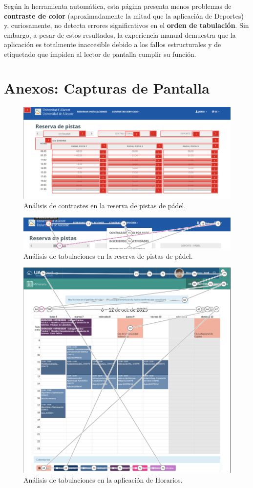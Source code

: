 \documentclass{article}
\begin{document}
	Según la herramienta automática, esta página presenta menos problemas de \textbf{contraste de color} (aproximadamente la mitad que la aplicación de Deportes) y, curiosamente, no detecta errores significativos en el \textbf{orden de tabulación}. Sin embargo, a pesar de estos resultados, la experiencia manual demuestra que la aplicación es totalmente inaccesible debido a los fallos estructurales y de etiquetado que impiden al lector de pantalla cumplir su función.

	\section{Anexos: Capturas de Pantalla
	}
		\begin{figure}[H]
		\centering
		\includegraphics[width=\textwidth]{horario_padel_contrastes.png}
		\caption{Análisis de contrastes en la reserva de pistas de pádel.}
		\label{fig:deportes_insights}
	\end{figure}

	\begin{figure}[H]
		\centering
		\includegraphics[width=\textwidth]{padel_tabulaciones.png}
		\caption{Análisis de tabulaciones en la reserva de pistas de pádel.}
		\label{fig:deportes_eyetracking}
	\end{figure}

	\begin{figure}[H]
		\centering
		\includegraphics[width=\textwidth]{hoario_tabulaciones.png}
		\caption{Análisis de tabulaciones en la aplicación de Horarios.}
		\label{fig:horarios}
	\end{figure}
\end{document}
